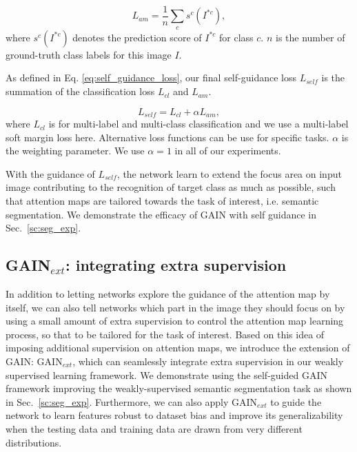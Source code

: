\documentclass[10pt,twocolumn,letterpaper]{article}
\begin{document}
\begin{equation}
\label{eq:loss_croped}
{L_{am}} = \frac{1}{n}\sum\limits_c {{s^c}({I^{*c}})},
\end{equation}
where ${{s^c}({I^{*c}})}$ denotes the prediction score of $I^ {*c}$ for class $c$.  $n$ is the number of ground-truth class labels for this image $I$.

As defined in Eq. \ref{eq:self_guidance_loss}, our final self-guidance loss $L_{self}$ is the summation of the classification loss $L_{cl}$ and $L_{am}$.



\begin{equation}
\label{eq:self_guidance_loss}
{L_{self}} = {L_{cl}} + \alpha{L_{am}},
\end{equation}
where ${L_{cl}}$ is for multi-label and multi-class classification and we use a multi-label soft margin loss here. Alternative loss functions can be use for specific tasks. $\alpha$ is the weighting parameter. We use $\alpha = 1$ in all of our experiments.

With the guidance of $L_{self}$, the network learn to extend the focus area on input image contributing to the recognition of target class as much as possible, such that attention maps are tailored towards the task of interest, i.e. semantic segmentation. We demonstrate the efficacy of GAIN with self guidance in Sec.~\ref{sc:seg_exp}.



\subsection{GAIN$_{ext}$: integrating extra supervision} \label{section:method_human_guided}

In addition to letting networks explore the guidance of the attention map by itself, we can also tell networks which part in the image they should focus on by using a small amount of extra supervision to control the attention map learning process, so that to be tailored for the task of interest. Based on this idea of imposing additional supervision on attention maps, we introduce the extension of GAIN: GAIN$_{ext}$, which can seamlessly integrate extra supervision in our weakly supervised learning framework. We demonstrate using the self-guided GAIN framework improving the weakly-supervised semantic segmentation task as shown in Sec.~\ref{sc:seg_exp}. Furthermore, we can also apply GAIN$_{ext}$ to guide the network to learn features robust to dataset bias and improve its generalizability when the testing data and training data are drawn from very different distributions.
\end{document}

